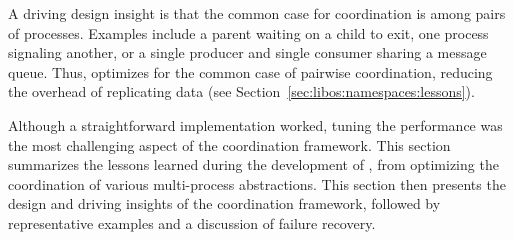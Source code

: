 \begin{comment}
Within a sandbox, each library OS tracks the PIDs of other \picoprocs{}.
As children are created, each library OS updates its own replica of the 
process tree, with annotations for which host-level connection corresponds
to the remote process.  
If a \picoproc{} signals itself, the signal system call simply calls the 
appropriate signal handling function in the application. 
If a \picoproc{} signals another \picoproc{},
the signal essentially becomes an asynchronous remote procedure call
from the sending library OS to the receiving library OS.
Note that this is all transparent to the unmodified application.
Section~\ref{sec:graphene:namespaces} describes these library OS-internal
coordination mechanisms in more detail.
The current \graphene{} prototype supports 
a range of coordination abstractions, including signaling, 
exit notification, System V message queues, thread identifiers and groups, sessions,
and the process tree.
We believe this sample is sufficiently representative that
remaining tail of Linux IPC abstractions could be easily added.

The reference monitor ensures security isolation
simply by preventing \picoprocs{} in different sandboxes from 
sharing host-level streams.
We adopted this approach to maximize dynamic sandboxing flexibility,
rather than, say, attempt to multiplex one single library OS instance across multiple processes.
\end{comment}


A driving design insight is that the common case
for coordination is among pairs of processes.
Examples include a parent waiting on a child to exit, 
one process signaling another, or a single producer and single consumer
sharing a message queue.
Thus, \graphene{} optimizes for the common case of pairwise coordination,
reducing the overhead of replicating data (see Section~\ref{sec:libos:namespaces:lessons}).



Although a straightforward implementation worked, tuning the performance was the most challenging aspect of the coordination framework. 
This section summarizes the lessons learned during the development of \graphene{}, from optimizing the coordination of various multi-process abstractions.
This section then
presents the design and driving insights of the coordination framework,
followed by representative examples 
and a discussion of failure recovery.

